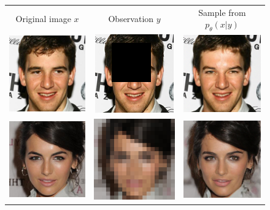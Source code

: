 \begin{figure}[h]
    \begin{center}
    \begin{tabular}{ccc}
        \scriptsize Original image $x$ & \scriptsize  Observation $y$ &  \scriptsize  Sample from $p_\theta(x|y)$  \\

        \includegraphics[width=.13\textwidth]{Outline/figures/non-uniform-diffusion-models/797_x.png} &   
        \includegraphics[width=.13\textwidth]{Outline/figures/non-uniform-diffusion-models/797_y.png} &
        \includegraphics[width=.13\textwidth]{Outline/figures/non-uniform-diffusion-models/797_1.png}  \\

          \includegraphics[width=.13\textwidth]{Outline/figures/non-uniform-diffusion-models/x.png} &   
        \includegraphics[width=.13\textwidth]{Outline/figures/non-uniform-diffusion-models/y.png} &
        \includegraphics[width=.13\textwidth]{Outline/figures/non-uniform-diffusion-models/DV.png}  \\


\end{tabular}
\end{center}
\end{figure}
